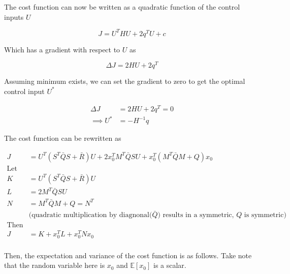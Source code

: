 \documentclass{article}
\begin{document}
The cost function can now be written as a quadratic function of the control inputs $U$

$$
J = U^T H U + 2 q^T U + c
$$

Which has a gradient with respect to $U$ as

$$
\Delta J = 2 H U + 2 q^T
$$

Assuming minimum exists, we can set the gradient to zero to get the optimal control input $U^*$

$$
\begin{aligned}
  \Delta J &= 2 H U + 2 q^T = 0 \\
  \implies U^* &= -H^{-1} q
\end{aligned}
$$


The cost function can be rewritten as

$$
\begin{aligned}
  J &= U^T(S^T \bar{Q} S + \bar{R}) U + 2 x_0^T M^T \bar{Q} S U + x_0^T(M^T \bar{Q} M + Q) x_0 \\
  \text{Let}& \\
  K &= U^T(S^T \bar{Q} S + \bar{R}) U \\
  L &= 2 M^T \bar{Q} S U \\
  N &= M^T \bar{Q} M + Q = N^T \\
  &\text{(quadratic multiplication by diagnonal($\bar{Q}$) results in a symmetric, $Q$ is symmetric)} \\
  \text{Then}& \\
  J &= K + x_0^T L + x_0^T N x_0 \\
\end{aligned}
$$

Then, the expectation and variance of the cost function is as follows. Take note that the random variable here is $x_0$ and $\mathbb{E}[x_0]$ is a scalar.

\end{document}
